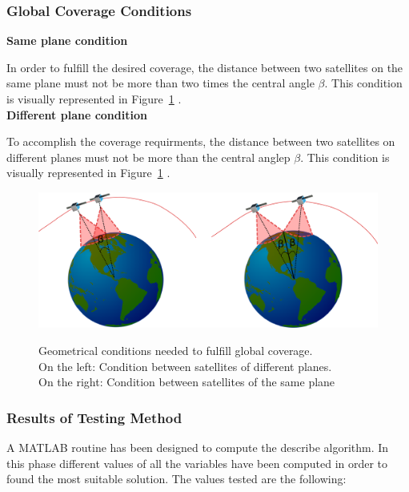 \subsubsection{Global Coverage Conditions}


\textbf{Same plane condition}\

In order to fulfill the desired coverage, the distance between two satellites on the same plane must not be more than two times the central angle $\beta$. This condition is visually represented in Figure~\ref{fig:ConditionGCoverage} .\\

\textbf{Different plane condition}\

To accomplish the coverage requirments, the distance between two satellites on different planes must not be more than the central anglep $\beta$. This condition is visually represented in Figure~\ref{fig:ConditionGCoverage} .\\

\begin{figure}%
	\centering
	\includegraphics[width=.8\textwidth]{./testing/ConditionGCoverage.png}\\
	\caption{Geometrical conditions needed to fulfill global coverage.\\
			On the left: Condition between satellites of different planes.\\
			On the right: Condition between satellites of the same plane}
	\label{fig:ConditionGCoverage}
\end{figure}

\subsubsection{Results of Testing Method}

A MATLAB routine has been designed to compute the describe algorithm. In this phase different values of all the variables have been computed in order to found the most suitable solution. The values tested are the following:


